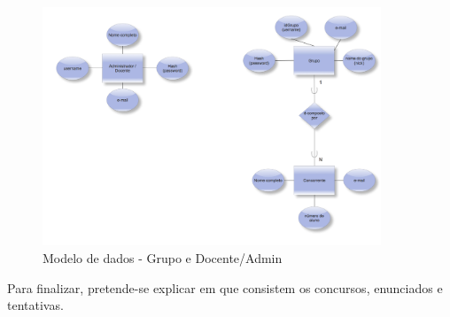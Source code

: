 \begin{figure}[htbp]
\begin{center}
\includegraphics[width=0.9\textwidth]{Images/grupo-docente}
\caption{Modelo de dados - Grupo e Docente/Admin}\label{fig modedados-grupo-doc}
\end{center}
\end{figure}


Para finalizar, pretende-se explicar em que consistem os concursos, enunciados e tentativas.

